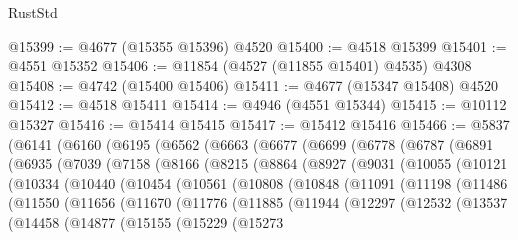 \begin{lexlean}{RustStd}
\begin{coremodule}
@15399 := @4677 (@15355 @15396) @4520
@15400 := @4518 @15399
@15401 := @4551 @15352
@15406 := @11854 (@4527 (@11855 @15401) @4535) @4308
@15408 := @4742 (@15400 @15406)
@15411 := @4677 (@15347 @15408) @4520
@15412 := @4518 @15411
@15414 := @4946 (@4551 @15344)
@15415 := @10112 @15327
@15416 := @15414 @15415
@15417 := @15412 @15416
@15466 := @5837
    (@6141
      (@6160
        (@6195
          (@6562
            (@6663
              (@6677
                (@6699
                  (@6778
                    (@6787
                      (@6891
                        (@6935
                          (@7039
                            (@7158
                              (@8166
                                (@8215
                                  (@8864
                                    (@8927
                                      (@9031
                                        (@10055
                                          (@10121
                                            (@10334
                                              (@10440
                                                (@10454
                                                  (@10561
                                                    (@10808
                                                      (@10848
                                                        (@11091
                                                          (@11198
                                                            (@11486
                                                              (@11550
                                                                (@11656
                                                                  (@11670
                                                                    (@11776
                                                                      (@11885
                                                                        (@11944
                                                                          (@12297
                                                                            (@12532
                                                                              (@13537
                                                                                (@14458
                                                                                  (@14877
                                                                                    (@15155
                                                                                      (@15229
                                                                                        (@15273

\end{coremodule}
\end{lexlean}
